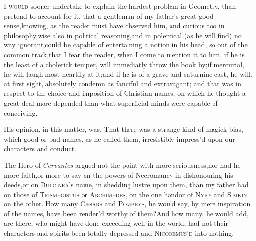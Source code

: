 \documentclass{article}
\begin{document}
\lettrine{I}{ would} sooner undertake to explain
the hardest problem in Geometry,\break
than pretend to account for it, that a\break
gentleman of my father’s great good
sense,\tsh  knowing, as the reader must have observed him,
and curious too in philosophy,\tsk  wise also in political
reasoning,\tsk  and in polemical (as he will find) no way
ignorant,\tsk  could be capable of entertaining a notion in his
head, so out of the common track,\tsk  that I fear the reader,
when I come to mention it to him, if he is the least of a cholerick
temper, will immediatly throw the book by;\break if mercurial, he will
laugh most heartily at it;\tsk  and if he is of a grave and
saturnine cast, he will, at first sight, absolutely condemn as
fanciful and extravagant; and that was in respect to the choice and
imposition of Christian names, on which he thought a great deal
more depended than what superficial minds were capable of
conceiving.\\

His opinion, in this matter, was, That there was a strange kind
of magick bias, which good or bad names, as he called them,
irresistibly impress’d upon our cha\-racters and conduct.

The Hero of \textit{Cervantes} argued not the point with more
seriousness,\tsh  nor had he more faith,\tsh  or
more to say on the powers of Necromancy in dishonouring his
deeds,\tsk  or on \textsc{Dulcinea}’s name, in
shedding lustre upon them, than my father had on those of
\textsc{Trismegistus} or \textsc{Archimedes}, on the
one hand\tsk  or of \textsc{Nyky} and \textsc{Simkin}
on the other. How many \textsc{Cæsars} and
\textsc{Pompeys}, he would say, by mere inspiration of the
names, have been render’d worthy of them?\break And how many, he would
add, are there, who might have done exceeding well in the world,
had not their characters and spirits been totally depressed and
\textsc{Nico\-demus’d} into nothing.
\end{document}

